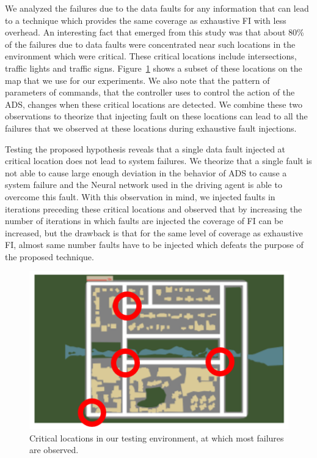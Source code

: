 We analyzed the failures due to the data faults for any information that can lead to a technique which provides the same coverage as exhaustive FI with less overhead. An interesting fact that emerged from this study was that about 80\% of the failures due to data faults were concentrated near such locations in the environment which were critical. These critical locations include intersections, traffic lights and traffic signs. Figure~\ref{fig:map_critical} shows a subset of these locations on the map that we use for our experiments. We also note that the pattern of parameters of commands, that the controller uses to control the action of the ADS, changes when these critical locations are detected. We combine these two observations to theorize that injecting fault on these locations can lead to all the failures that we observed at these locations during exhaustive fault injections.

Testing the proposed hypothesis reveals that a single data fault injected at critical location does not lead to system failures. We theorize that a single fault is not able to cause large enough deviation in the behavior of ADS to cause a system failure and the Neural network used in the driving agent is able to overcome this fault. With this observation in mind, we injected faults in iterations preceding these critical locations and observed that by increasing the number of iterations in which faults are injected the coverage of FI can be increased, but the drawback is that for the same level of coverage as exhaustive FI, almost same number faults have to be injected which defeats the purpose of the proposed technique.   

\begin{figure}  
	\vspace{1.0em}
	\centering
	\includegraphics[scale=0.7]{map_critical}
	\vspace{-0.5em}
	\caption{Critical locations in our testing environment, at which most failures are observed.}
	\label{fig:map_critical}
	\vspace{-1.5em}
\end{figure}  


